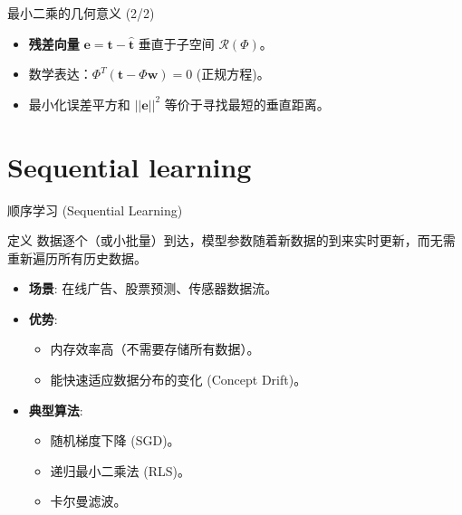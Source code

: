 \documentclass[12pt, aspectratio=169]{beamer}
\newcommand{\bw}{\mathbf{w}}
\newcommand{\bt}{\mathbf{t}}
\begin{document}
\begin{frame}{最小二乘的几何意义 (2/2)}
    \begin{center}
    \end{center}
    
    \vspace{0.5cm}
    \begin{itemize}
        \item \textbf{残差向量} $\mathbf{e} = \bt - \hat{\bt}$ 垂直于子空间 $\mathcal{R}(\Phi)$。
        \item 数学表达：$\Phi^T (\bt - \Phi \bw) = 0$ (正规方程)。
        \item 最小化误差平方和 $||\mathbf{e}||^2$ 等价于寻找最短的垂直距离。
    \end{itemize}
\end{frame}

\section{Sequential learning}
\begin{frame}{顺序学习 (Sequential Learning)}
    \begin{block}{定义}
        数据逐个（或小批量）到达，模型参数随着新数据的到来实时更新，而无需重新遍历所有历史数据。
    \end{block}
    
    \vspace{0.5cm}
    \begin{itemize}
        \item \textbf{场景}: 在线广告、股票预测、传感器数据流。
        \item \textbf{优势}:
        \begin{itemize}
            \item 内存效率高（不需要存储所有数据）。
            \item 能快速适应数据分布的变化 (Concept Drift)。
        \end{itemize}
        \item \textbf{典型算法}: 
        \begin{itemize}
            \item 随机梯度下降 (SGD)。
            \item 递归最小二乘法 (RLS)。
            \item 卡尔曼滤波。
        \end{itemize}
    \end{itemize}
\end{frame}
\end{document}
